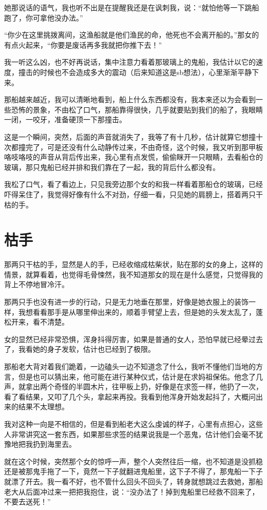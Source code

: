 她那说话的语气，我也听不出是在提醒我还是在讽刺我，说：“就怕他等一下跳船跑了，你可拿他没办法。”

“你少在这里挑拨离间，这渔船就是他们渔民的命，他死也不会离开船的。”那女的有点火起来，“你要是废话再多我就把你推下去！”

我一听这么凶，也不好再说话，集中注意力看着那玻璃上的鬼船，我估计以它的速度，撞击的时候也不会造成多大的震动（后来知道这是sb想法），心里渐渐平静下来。

那船越来越近，我可以清晰地看到，船上什么东西都没有，我本来还以为会看到一些恐怖的景象，不由松了口气，那船靠得很快，几乎就要贴到我们的船了，我眼睛一闭，一咬牙，准备硬顶一下那撞击。

这是一个瞬间，突然，后面的声音就消失了，我等了有十几秒，估计就算它想撞十次都撞完了，可是还没有什么动静传过来，不由奇怪，这个时候，我又听到那甲板咯吱咯吱的声音从背后传出来，我心里有点发慌，偷偷眯开一只眼睛，去看船仓的玻璃，那只鬼船已经并排和我们靠在了一起，我的背后什么都没有。

我松了口气，看了看边上，只见我旁边那个女的和我一样看着那船仓的玻璃，已经吓得呆住了，我觉得好像有什么不对劲，仔细一看，只见她的肩膀上，搭着两只干枯的手。

\chapter{枯手}

那两只干枯的手，显然是人的手，已经收缩成枯柴状，贴在那的女的身上，这样的情景，就算看着，也觉得毛骨悚然，我不知道那女的现在是什么感觉，只觉得我的背上不停地冒冷汗。

那两只手也没有进一步的行动，只是无力地垂在那里，好像是她衣服上的装饰一样，我想看看那手是从哪里伸出来的，顺着手臂望上去，但是她的头发太乱了，蓬松开来，看不清楚。

女的显然已经非常恐惧，浑身抖得厉害，如果是普通的女人，恐怕早就已经晕过去了，我看她的身子发软，估计也已经到了极限。

那船老大背对着我们跪着，一边磕头一边不知道念了什么，我听不懂他们当地的方言，但是也可以猜出来，他可能在进行某种仪式，估计是在求妈祖保佑。他念了几声，就拿出两个奇怪的半圆木片，往甲板上扔，好像是在求签一样，他扔了一次，看了看结果，又叩了几个头，拿起来再投。我看到他浑身开始发起抖了，大概问出来的结果不太理想。

我对这种一向是不相信的，但是看到船老大这么虔诚的样子，心里有点担心，这些人非常讲究这一套东西，如果那些求签的结果说我是一个恶鬼，估计他们会毫不犹豫地把我扔到海里去。

就在这个时候，突然那个女的惊呼一声，整个人突然往后一缩，也不知道是没抓稳还是被那鬼手拖了一下，竟然一下子就翻进鬼船里，这下子不得了，那鬼船一下子就漂了开去。我一看不好，也不管什么回头不回头了，转身就想跳过去救她，那船老大从后面冲过来一把把我抱住，说：“没办法了！掉到鬼船里已经救不回来了，不要去送死！”

